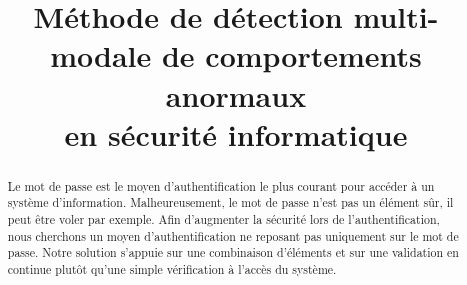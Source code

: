 \documentclass[conference,compsoc]{IEEEtran}
\begin{document}
%
\title{Méthode de détection multi-modale de comportements anormaux\\ en sécurité informatique}


\author{
\and
{}
\and
{}
\and
{}
}




\maketitle

\begin{abstract}
Le mot de passe est le moyen d'authentification le plus courant pour accéder à un système d'information.
 Malheureusement, le mot de passe n'est pas un élément sûr, il peut être voler par exemple.
 Afin d'augmenter la sécurité lors de l'authentification, nous cherchons un moyen d'authentification ne reposant pas uniquement sur le mot de passe.
 Notre solution s'appuie sur une combinaison d'éléments et sur une validation en continue plutôt qu'une simple vérification à l'accès du système.
\end{abstract}





%
\IEEEpeerreviewmaketitle
\end{document}
